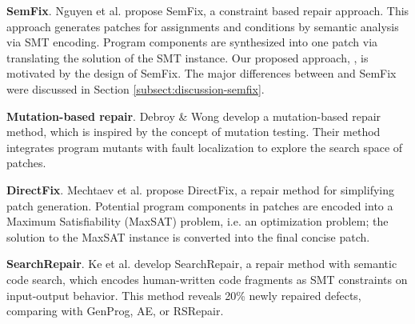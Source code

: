 \textbf{SemFix}. Nguyen et al. \cite{nguyen2013semfix} propose SemFix, a constraint based repair approach. This approach generates patches for assignments and conditions by semantic analysis via SMT encoding. Program components are synthesized into one patch via translating the solution of the SMT instance. 
Our proposed approach, \nopol, is motivated by the design of SemFix. The major differences between \nopol and SemFix were discussed in Section \ref{subsect:discussion-semfix}. 

\textbf{Mutation-based repair}. Debroy \& Wong \cite{debroy2010using} develop a mutation-based repair method, which is inspired by the concept of mutation testing. Their method integrates program mutants with fault localization to explore the search space of patches. 

\textbf{DirectFix}. Mechtaev et al. \cite{mechtaev2015directfix} propose DirectFix, a repair method for simplifying patch generation. Potential program components in patches are encoded into a Maximum Satisfiability (MaxSAT) problem, i.e. an optimization problem; the solution to the MaxSAT instance is converted into the final concise patch.

\textbf{SearchRepair}. Ke et al. \cite{Ke15ase} develop SearchRepair, a repair method with semantic code search, which encodes human-written code fragments as SMT constraints on input-output behavior. This method reveals 20\% newly repaired defects, comparing with GenProg, AE, or RSRepair. 

